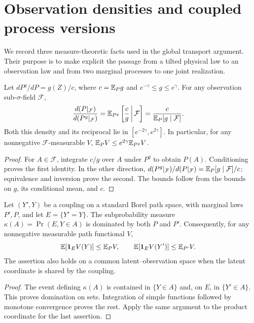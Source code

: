 \section{Observation densities and coupled process versions}
\label{sec:v20-versions}
We record three measure-theoretic facts used in the global transport
argument. Their purpose is to make explicit the passage from a tilted
physical law to an observation law and from two marginal processes to
one joint realization.

\begin{lemma}
\label{lem:v20-tilt}
Let $dP^g/dP=g(Z)/c$, where $c=\mathbb E_Pg$ and
$e^{-\gamma}\le g\le e^\gamma$. For any observation sub-$\sigma$-field
$\mathcal F$,
\begin{equation}\label{eq:v20-tilt}
 \frac{d(P|_{\mathcal F})}{d(P^g|_{\mathcal F})}
 =\mathbb E_{P^g}\left[\frac{c}{g}\,\middle|\,\mathcal F\right]
 =\frac{c}{\mathbb E_P[g\mid\mathcal F]}.
\end{equation}
Both this density and its reciprocal lie in
$[e^{-2\gamma},e^{2\gamma}]$. In particular, for any nonnegative
$\mathcal F$-measurable $V$,
$\mathbb E_P V\le e^{2\gamma}\mathbb E_{P^g}V$.
\end{lemma}
\begin{proof}
For $A\in\mathcal F$, integrate $c/g$ over $A$ under $P^g$ to obtain
$P(A)$. Conditioning proves the first identity. In the other direction,
$d(P^g|_{\mathcal F})/d(P|_{\mathcal F})=\mathbb E_P[g\mid\mathcal F]/c$;
equivalence and inversion prove the second. The bounds follow from the
bounds on $g$, its conditional mean, and $c$.
\end{proof}

\begin{lemma}
\label{lem:v20-diagonal}
Let $(Y',Y)$ be a coupling on a standard Borel path space, with marginal
laws $P',P$, and let $E=\{Y'=Y\}$. The subprobability measure
$\kappa(A)=\Pr(E,Y\in A)$ is dominated by both $P$ and $P'$.
Consequently, for any nonnegative measurable path functional $V$,
\[
 \mathbb E[\mathbf 1_E V(Y)]\le\mathbb E_P V,
 \qquad \mathbb E[\mathbf 1_E V(Y')]\le\mathbb E_{P'} V.
\]
The assertion also holds on a common latent--observation space when the
latent coordinate is shared by the coupling.
\end{lemma}
\begin{proof}
The event defining $\kappa(A)$ is contained in $\{Y\in A\}$ and,
on $E$, in $\{Y'\in A\}$. This proves domination on sets. Integration
of simple functions followed by monotone convergence proves the rest.
Apply the same argument to the product coordinate for the last assertion.
\end{proof}

